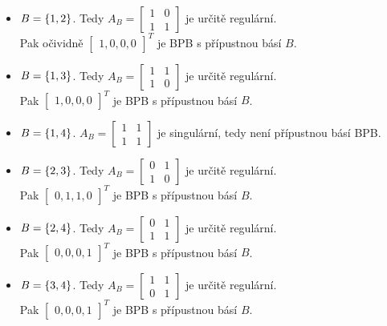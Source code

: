 \begin{itemize}
    \item $B = \left\lbrace 1,2 \right\rbrace$. Tedy $A_B =
        \begin{bmatrix}
            1 & 0 \\
            1 & 1
        \end{bmatrix}$ je určitě regulární.\\
        Pak očividně $\begin{bmatrix}1, 0, 0, 0\end{bmatrix}^T$ je BPB s přípustnou básí $B$.
    \item $B = \left\lbrace 1,3 \right\rbrace$. Tedy $A_B =
        \begin{bmatrix}
            1 & 1 \\
            1 & 0
        \end{bmatrix}$ je určitě regulární.\\
        Pak $\begin{bmatrix}1, 0, 0, 0\end{bmatrix}^T$ je BPB s přípustnou básí $B$.
    \item $B = \left\lbrace 1,4 \right\rbrace$. $A_B =
        \begin{bmatrix}
            1 & 1 \\
            1 & 1
        \end{bmatrix}$ je singulární, tedy není přípustnou básí BPB.
    \item $B = \left\lbrace 2,3 \right\rbrace$. Tedy $A_B =
        \begin{bmatrix}
            0 & 1 \\
            1 & 0
        \end{bmatrix}$ je určitě regulární.\\
        Pak $\begin{bmatrix}0, 1, 1, 0\end{bmatrix}^T$ je BPB s přípustnou básí $B$.
    \item $B = \left\lbrace 2,4 \right\rbrace$. Tedy $A_B =
        \begin{bmatrix}
            0 & 1 \\
            1 & 1
        \end{bmatrix}$ je určitě regulární.\\
        Pak $\begin{bmatrix}0, 0, 0, 1\end{bmatrix}^T$ je BPB s přípustnou básí $B$.
    \item $B = \left\lbrace 3,4 \right\rbrace$. Tedy $A_B =
        \begin{bmatrix}
            1 & 1 \\
            0 & 1
        \end{bmatrix}$ je určitě regulární.\\
        Pak $\begin{bmatrix}0, 0, 0, 1\end{bmatrix}^T$ je BPB s přípustnou básí $B$.
\end{itemize}

